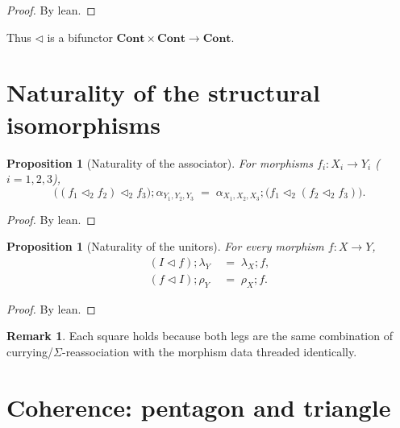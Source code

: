 \documentclass[11pt,a4paper]{article}
\theoremstyle{plain}
\newtheorem{proposition}[theorem]{Proposition}
\theoremstyle{definition}
\newtheorem{remark}[theorem]{Remark}
\newcommand{\Cont}{\mathbf{Cont}}
\newcommand{\seq}{\mathbin{\triangleleft}}
\begin{document}
\begin{proof}
By lean.
\end{proof}

Thus $\seq$ is a bifunctor $\Cont \times \Cont \to \Cont$.

\section{Naturality of the structural isomorphisms}

\begin{proposition}[Naturality of the associator]\label{prop:assoc-nat}
For morphisms $f_i : X_i \to Y_i$ ($i=1,2,3$),
\begin{equation}
  \bigl((f_1 \seq_2 f_2) \seq_2 f_3\bigr)
  \mathbin{;}
  \alpha_{Y_1,Y_2,Y_3}
  \;=\;
  \alpha_{X_1,X_2,X_3}
  \mathbin{;}
  \bigl(f_1 \seq_2 (f_2 \seq_2 f_3)\bigr).
\end{equation}
\end{proposition}

\begin{proof}
By lean.
\end{proof}

\begin{proposition}[Naturality of the unitors]\label{prop:unit-nat}
For every morphism $f : X \to Y$,
\begin{align}
  (I \seq f) \mathbin{;} \lambda_Y
  &\;=\;
  \lambda_X \mathbin{;} f, \\[4pt]
  (f \seq I) \mathbin{;} \rho_Y
  &\;=\;
  \rho_X \mathbin{;} f.
\end{align}
\end{proposition}

\begin{proof}
By lean.
\end{proof}

\begin{remark}
Each square holds because both legs are the same combination of
currying/$\Sigma$-reassociation with the morphism data threaded
identically.
\end{remark}

\section{Coherence: pentagon and triangle}
\end{document}
